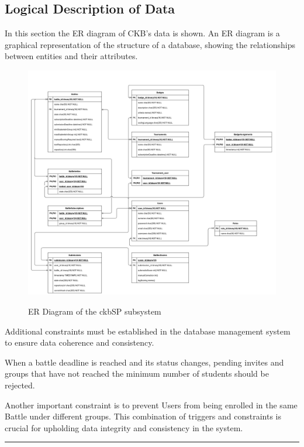 \documentclass{Configuration_Files/Template}
\begin{document}
\subsection{Logical Description of Data}

In this section the ER diagram of CKB's data is shown. An ER diagram is a graphical representation of the structure of a database, showing the relationships between entities and their attributes.

\begin{figure}[H]
\centering
\includegraphics[scale = 0.4]{Images/diagrams/ER_Diagram.png}\\
\caption{ER Diagram of the ckbSP subsystem}
\end{figure}

Additional constraints must be established in the database management system to ensure data coherence and consistency.

When a battle deadline is reached and its status changes, pending invites and groups that have not reached the minimum number of students should be rejected.

Another important constraint is to prevent Users from being enrolled in the same Battle under different groups. This combination of triggers and constraints is crucial for upholding data integrity and consistency in the system.

{\color{bluepoli}\rule{\linewidth}{0.1pt}}
\end{document}
